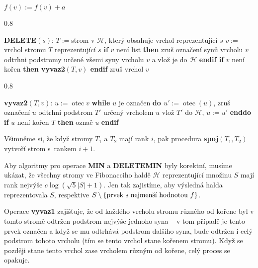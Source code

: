 \documentclass[a4paper,12pt]{article}
\DeclareMathOperator*{\otec}{otec}
\newcommand{\algoritmus}[1]{
  {
  \setlength\fboxrule{0.5pt}

  \begin{boxedminipage}{0.8\textwidth}

 #1
  \end{boxedminipage}

  }
  }
\begin{document}
{{$f(v):=f(v)+a$
}}\algoritmus{{\bf
DELETE$(s)$}:\newline 
$T:=$strom v $\mathcal H$, který obsahuje vrchol reprezentující $
s$\newline 
$v:=$vrchol stromu $T$ reprezentující $s$\newline 
{\bf \textsf{if}} $v$ není list {\bf \textsf{then}\newline 
\phantom{{\rm ---}}}zruš označení synů vrcholu $
v$\newline 
\phantom{---}odtrhni podstromy určené všemi syny 
vrcholu $v$ a vlož je {do} $\mathcal H$\newline 
{\bf \textsf{endif}\newline 
\textsf{if}} $v$ není kořen {\bf \textsf{then} vyvaz2$(T,v)$ \textsf{endif}\newline }
zruš vrchol $v$
}
\algoritmus{

{\bf vyvaz2$(T,v)$}:\newline 
$u:=\otec v$\newline 
{\bf \textsf{while}} $u$ je označen {\bf \textsf{do}\newline 
\phantom{{\rm ---}}$u':=\otec(u)$}, zruš označení $u$\newline 
\phantom{---}odtrhni podstrom $T'$ určený vrcholem $u$\newline 
\phantom{---}vlož $T'$ {do} $\mathcal H$, $u:=u'$\newline 
{\bf \textsf{enddo}\newline 
\textsf{if}} $u$ není kořen $T$ {\bf \textsf{then}} označ $u$ {\bf \textsf{endif}
}}

Všimněme si, že když stromy $T_1$ a $T_2$ mají rank 
$i$, pak procedura {\bf spoj$(T_1,T_2)$} vytvoří strom s~rankem 
$i+1$.  

Aby algoritmy pro operace {\bf MIN} a {\bf DELETEMIN} byly 
korektní, musíme ukázat, že všechny stromy ve 
Fibonacciho haldě $\mathcal H$ reprezentující množinu $
S$ mají rank 
nejvýše $c\log(\sqrt 5|S|+1)$. Jen tak zajistíme, aby výsledná 
halda reprezentovala $S$, res\-pektive 
$S\setminus \{\text{\rm prvek s~nejmenší hodnotou }f\}$. 

 Operace {\bf vyvaz1 }
zajišťuje, že od každého vrcholu stromu různého 
od kořene byl v tomto stromě odtržen podstrom nejvýše 
jednoho syna -- v tom případě je tento prvek označen a 
když se mu odtrhává podstrom dalšího syna, bude odtržen 
i celý podstrom tohoto vrcholu (tím se tento vrchol stane kořenem 
stromu).  Když se později stane tento vrchol zase 
vrcholem různým od kořene, celý proces se 
opakuje. 
\end{document}
